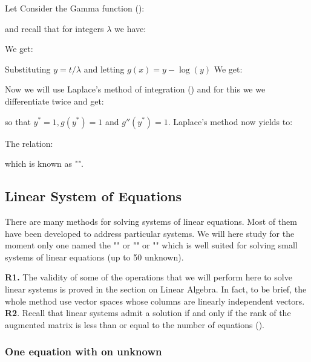 	Let Consider the Gamma function ():
	
	and recall that for integers $\lambda$ we have:
	
	We get:
	
	Substituting $y=t/\lambda$ and letting $g(x)=y-\log (y)$ We get: 
	
	Now we will use Laplace's method of integration () and for this we we differentiate twice and get:
	
	so that $y^*=1,g(y^*)=1$ and $g''(y^*)=1$. Laplace's method now
	yields to:
	
	The relation:
	
	which is known as "".
	
	\pagebreak
	\subsection{Linear System of Equations}
	
	There are many methods for solving systems of linear equations. Most of them have been developed to address particular systems. We will here study for the moment only one named the "" or "" or "" which is well suited for solving small systems of linear equations (up to 50 unknown).
	
	\begin{tcolorbox}[title=Remarks,colframe=black,arc=10pt]
	\textbf{R1.} The validity of some of the operations that we will perform here to solve linear systems is proved in the section on Linear Algebra. In fact, to be brief, the whole method use vector spaces whose columns are linearly independent vectors.\\

	\textbf{R2}. Recall that linear systems admit a solution if and only if the rank of the augmented matrix is less than or equal to the number of equations ().
	\end{tcolorbox}
	
	\subsubsection{One equation with on unknown}
	
